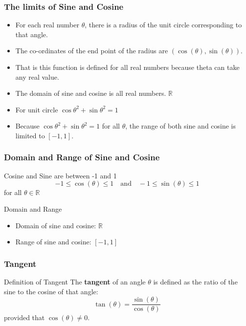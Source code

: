\documentclass{beamer}
\begin{document}
\begin{frame}
    \frametitle{The limits of Sine and Cosine} 
    \begin{itemize}
        \item For each real number $\theta$, there is a radius of the unit circle corresponding to that angle.
        \item The co-ordinates of the end point of the radius are $(\cos(\theta), \sin(\theta))$.
        \item That is this function is defined for all real numbers because theta can take any real value. 
        \item The domain of sine and cosine is all real numbers. \(\mathbb{R}\) 
        \item For unit circle \( \cos \theta^{2} + \sin \theta^{2} = 1 \) 
        \item Because \( \cos \theta^{2} + \sin \theta^{2} = 1 \) for all \(\theta\), the range of both sine and cosine is limited to \([-1, 1]\).
    \end{itemize}
\end{frame}

\begin{frame}
    \frametitle{Domain and Range of Sine and Cosine}
    \begin{block}{Cosine and Sine are between -1 and 1}
        \[
        -1 \leq \cos(\theta) \leq 1 \quad \text{and} \quad -1 \leq \sin(\theta) \leq 1
        \] for all \(\theta \in \mathbb{R}\)
    \end{block}
    \begin{block}{Domain and Range}
        \begin{itemize}
            \item Domain of sine and cosine: \(\mathbb{R}\)
            \item Range of sine and cosine: \([-1, 1]\)
        \end{itemize}
    \end{block}
\end{frame}

\begin{frame}
    \frametitle{Tangent}
    \begin{block}{Definition of Tangent}
        The \textbf{tangent} of an angle $\theta$ is defined as the ratio of the sine to the cosine of that angle:
        \[\tan(\theta) = \frac{\sin(\theta)}{\cos(\theta)}\]   
        provided that \(\cos(\theta) \neq 0\).
    \end{block}
\end{frame}
\end{document}
